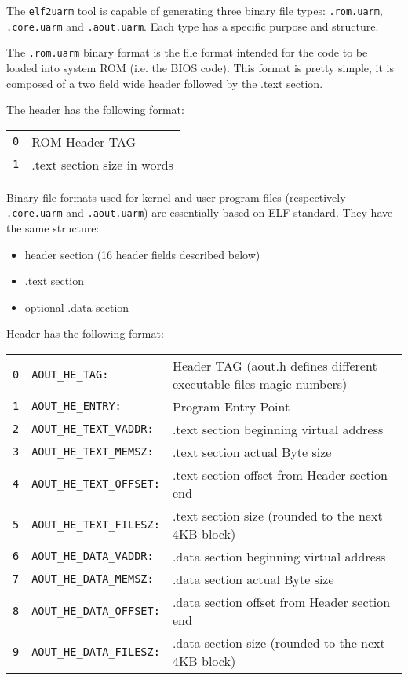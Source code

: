 
The \texttt{elf2uarm} tool is capable of generating three binary file types: \texttt{.rom.uarm}, \texttt{.core.uarm} and \texttt{.aout.uarm}.
Each type has a specific purpose and structure.

The \texttt{.rom.uarm} binary format is the file format intended for the code to be loaded into system ROM (i.e. the BIOS code).
This format is pretty simple, it is composed of a two field wide header followed by the .text section.

The header has the following format:
\\

\noindent
\begin{tabular}{rp{8cm}}
\texttt{0} & ROM Header TAG \\
\texttt{1} & .text section size in words \\
\end{tabular}

Binary file formats used for kernel and user program files (respectively \texttt{.core.uarm} and \texttt{.aout.uarm}) are essentially based on ELF standard. 
They have the same structure:
\begin{itemize}
\item header section (16 header fields described below)
\item .text section
\item optional .data section
\end{itemize}

Header has the following format:
\\

\noindent
\begin{tabular}{rlp{8cm}}
\texttt{0} & \texttt{AOUT\_HE\_TAG:} & Header TAG (aout.h defines different executable files magic numbers) \\
\texttt{1} & \texttt{AOUT\_HE\_ENTRY:} & Program Entry Point \\
\texttt{2} & \texttt{AOUT\_HE\_TEXT\_VADDR:} & .text section beginning virtual address \\
\texttt{3} & \texttt{AOUT\_HE\_TEXT\_MEMSZ:} & .text section actual Byte size \\
\texttt{4} & \texttt{AOUT\_HE\_TEXT\_OFFSET:} & .text section offset from Header section end \\
\texttt{5} & \texttt{AOUT\_HE\_TEXT\_FILESZ:} & .text section size (rounded to the next 4KB block) \\
\texttt{6} & \texttt{AOUT\_HE\_DATA\_VADDR:} & .data section beginning virtual address \\
\texttt{7} & \texttt{AOUT\_HE\_DATA\_MEMSZ:} & .data section actual Byte size \\
\texttt{8} & \texttt{AOUT\_HE\_DATA\_OFFSET:} & .data section offset from Header section end \\
\texttt{9} & \texttt{AOUT\_HE\_DATA\_FILESZ:} & .data section size (rounded to the next 4KB block) \\
\end{tabular}
\\

